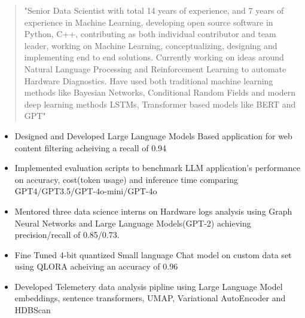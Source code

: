 \documentclass[10pt,a4paper,ragged2e,withhyper]{altacv}
\author{Aidan Scannell}
\date{\today}
\title{}
\begin{document}

\makecvheader

\begin{paracol}{1}
 \begin{quote}
"Senior Data Scientist with total 14 years of experience, and 7 years of experience in Machine Learning, developing open source software in Python, C++, contributing as both individual contributor and team leader, working on Machine Learning, conceptualizing, designing and implementing end to end solutions. Currently working on ideas around Natural Language Processing and Reinforcement Learning to automate Hardware Diagnostics. Have used both traditional machine learning methods like Bayesian Networks, Conditional Random Fields and modern deep learning methods LSTMs, Transformer based models like BERT and GPT"
 \end{quote}
\label{sec:orga9d92b8}


\divider

\divider


\label{sec:org7c796df}

\begin{itemize}
\item Designed and Developed Large Language Models Based application for web content
filtering acheiving a recall of 0.94
\item Implemented evaluation scripts to benchmark LLM application's performance on
accuracy, cost(token usage) and inference time comparing GPT4/GPT3.5/GPT-4o-mini/GPT-4o
\item Mentored three data science interns on Hardware logs analysis using Graph
Neural Networks and Large Language Models(GPT-2) achieving precision/recall of 0.85/0.73.
\item Fine Tuned 4-bit quantized Small language Chat model on custom data set using QLORA
acheiving an accuracy of 0.96
\item Developed Telemetery data analysis pipline using Large Language Model
embeddings, sentence transformers, UMAP, Variational AutoEncoder and HDBScan
\end{itemize}


\end{paracol}
\end{document}
